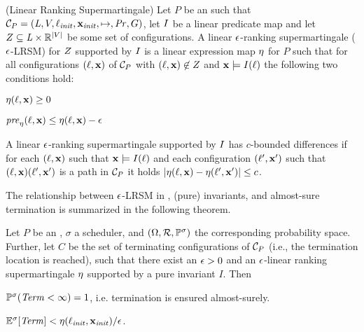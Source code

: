 \smallskip
\begin{definition}(Linear Ranking Supermartingale)
\label{def:lrsm}
Let $P$ be an \APP{} such that $\mathcal{C}_P = 
(\mathit{L},V,\ell_{\mathit{init}},\mathbf{x}_{\mathit{init}},\mapsto,\mathit{Pr},G)$, let $I$ be 
a linear predicate map and let 
$Z\subseteq \mathit{L} \times \mathbb{R}^{|V|}$ be some set of 
configurations. 
A linear $\epsilon$-ranking supermartingale ($\epsilon$-LRSM) for $Z$ 
supported by $I$ is a 
linear expression map $\eta$ for $P$ such that for all configurations 
$(\ell,\mathbf{x})$ of $\mathcal{C}_P$ with
$(\ell,\mathbf{x})\not\in Z$ and $\mathbf{x}\models I(\ell)$ the following 
two conditions hold:
\begin{compactitem}
\item
$\eta(\ell,\mathbf{x})\geq 0$
\item 
$\mathit{pre}_{\eta}(\ell,\mathbf{x}) \leq \eta(\ell,\mathbf{x})-\epsilon$ 
\end{compactitem}
A linear $\epsilon$-ranking supermartingale supported by $I$ has 
$c$-bounded differences if for each $(\ell,\mathbf{x})$ such that $\mathbf{x}\models 
I(\ell)$ and each configuration $(\ell',\mathbf{x}')$ such that $(\ell,\mathbf{x}) 
(\ell',\mathbf{x}')$ is a path in $\mathcal{C}_P$ it holds 
$|\eta(\ell,\mathbf{x})-\eta(\ell',\mathbf{x}')|\leq c$. 
\end{definition}


The relationship between $\epsilon$-LRSM in , (pure) invariants, and almost-sure termination 
is summarized in the following theorem. 
\smallskip
\begin{theorem}
\label{thm:old-ranking}
Let $P$ be an \APP{}, $\sigma$ a scheduler, and 
$(\Omega,\mathcal{R},\mathbb{P}^\sigma)$ the corresponding probability space. Further, 
let $C$ be the set of terminating configurations of $\mathcal{C}_P$ (i.e., the termination
location is reached), such that there exist an $\epsilon>0$ and an $\epsilon$-linear ranking 
supermartingale $\eta$ supported by a pure invariant $I$. 
Then 
\begin{compactenum}
\item
$\mathbb{P}^{\sigma}(\mathit{Term}<\infty)=1$, i.e. termination is ensured almost-surely.
\item
$\mathbb{E}^{\sigma}[\mathit{Term}]<\eta(\ell_{\mathit{init}},\mathbf{x}_{\mathit{init}})/\epsilon$.
\end{compactenum}
\end{theorem}


